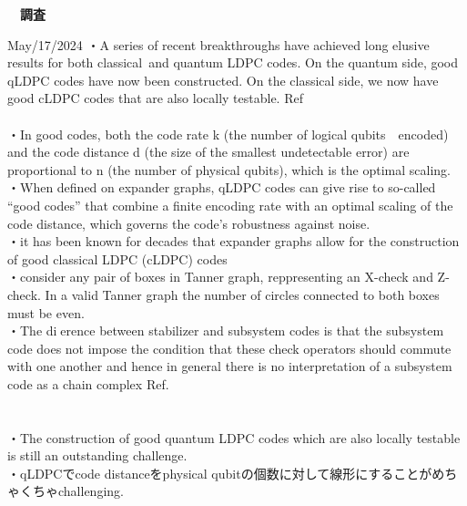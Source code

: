 \documentclass[a4paper,10.5pt]{ltjsarticle}
\begin{document}
\centerline
{\huge \bfseries　調査}
\rightline
{May/17/2024}
\leftline
{}
・A series of recent breakthroughs have achieved long elusive results for both classical\ and quantum LDPC codes. On the quantum side, good qLDPC codes
have now been constructed. On the classical side, we now have good cLDPC codes that are also locally testable. Ref\cite{1}\\
\\
・In good codes, both the code rate k (the number of logical qubits　encoded) and the code distance d (the size of the smallest undetectable error) are proportional to n (the number of physical qubits), which is the optimal scaling.\\
・When defined on expander graphs, qLDPC codes can give rise to so-called “good
codes” that combine a finite encoding rate with an optimal scaling of the code distance, which governs the code’s robustness against noise.\\
・it has been known for decades that expander graphs allow for the construction of good classical LDPC (cLDPC) codes\\
・consider any pair of boxes in Tanner graph, reppresenting an X-check and Z-check.
In a valid Tanner graph the number of circles connected to both boxes must be even.\\
・The dierence between stabilizer and subsystem codes is that the subsystem
code does not impose the condition that these check operators should commute with one another
and hence in general there is no interpretation of a subsystem code as a chain complex Ref\cite{2}.\\
\\
\\
・The construction of good quantum LDPC codes which are also locally testable is still an outstanding challenge.\\
・qLDPCでcode distanceをphysical qubitの個数に対して線形にすることがめちゃくちゃchallenging.\\
\end{document}
